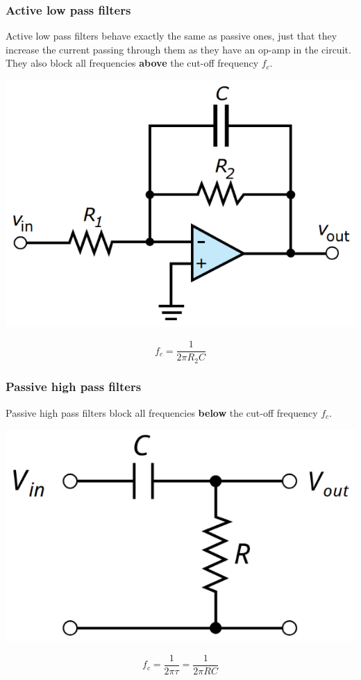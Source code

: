 \documentclass[11pt]{article}
\begin{document}
 \newpage

\subsubsection{Active low pass filters}
\label{sec:org63c3c18}
Active low pass filters behave exactly the same as passive ones, just that they increase the current passing through them as they have an op-amp in the circuit. They also block all frequencies \textbf{above} the cut-off frequency \(f_c\).
\begin{center}
\includegraphics[width=.9\linewidth]{./images/active-low-pass-filter.png}
\end{center}
\[f_c = \frac{1}{2 \pi R_2 C}\]

 \newpage

\subsubsection{Passive high pass filters}
\label{sec:org04b7468}
Passive high pass filters block all frequencies \textbf{below} the cut-off frequency \(f_c\).
\begin{center}
\includegraphics[width=.9\linewidth]{./images/passive-high-pass-filter.png}
\end{center}
\[f_c = \frac{1}{2 \pi \tau} = \frac{1}{2 \pi RC}\]
\end{document}

